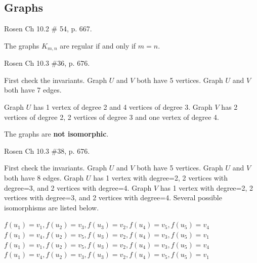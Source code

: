 \begin{questions}



\section*{Graphs}

 Rosen Ch 10.2 \# 54, p. 667.
    \ifprintanswers
        \vspace{-12pt}
    \fi
    \begin{solution}
        The graphs $K_{m,n}$ are regular if and only if $m=n$.
    \end{solution}



 Rosen Ch 10.3 \#36, p. 676. 
    \ifprintanswers
        \vspace{-10pt}
    \fi
    \begin{solution}
    First check the invariants.  Graph $U$ and $V$ both have 5 vertices. Graph $U$ and $V$ both have 7 edges.

    Graph $U$ has 1 vertex of degree 2 and 4 vertices of degree 3.  Graph $V$ has 2 vertices of degree 2, 2 vertices of degree 3 and one vertex of degree 4. 

    The graphs are \textbf{not isomorphic}.
    \end{solution}



 Rosen Ch 10.3 \#38, p. 676.
    \ifprintanswers
        \vspace{-10pt}
    \fi
    \begin{solution}
    First check the invariants.  Graph $U$ and $V$ both have 5 vertices. Graph $U$ and $V$ both have 8 edges. Graph $U$ has 1 vertex with degree=2, 2 vertices with degree=3, and 2 vertices with degree=4.  Graph $V$ has 1 vertex with degree=2, 2 vertices with degree=3, and 2 vertices with degree=4.  Several possible  isomorphisms are listed below.
    
            $ f(u_1) = v_1, f(u_2) = v_3, f(u_3) = v_2, f(u_4) = v_5, f(u_5) = v_4 $\\
            $ f(u_1) = v_4, f(u_2) = v_5, f(u_3) = v_2, f(u_4) = v_3, f(u_5) = v_1 $ \\
            $ f(u_1) = v_1, f(u_2) = v_5, f(u_3) = v_2, f(u_4) = v_3, f(u_5) = v_4 $\\
            $ f(u_1) = v_4, f(u_2) = v_3, f(u_3) = v_2, f(u_4) = v_5, f(u_5) = v_1 $
    \end{solution}



\end{questions}
